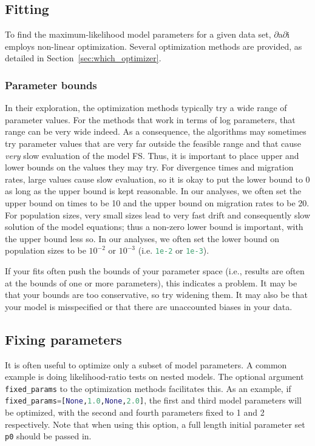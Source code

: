 \documentclass[12pt]{article}
\makeatletter
\newcommand{\dadi}{$\partial$a$\partial$i\xspace}
\newcommand{\py}[1]{\lstinline[language=Python, showstringspaces=False]@#1@}
\makeatother
\begin{document}
\subsection{Fitting}

To find the maximum-likelihood model parameters for a given data set, \dadi employs non-linear optimization.
Several optimization methods are provided, as detailed in Section~\ref{sec:which_optimizer}.

\subsubsection{Parameter bounds}

In their exploration, the optimization methods typically try a wide range of parameter values.
For the methods that work in terms of log parameters, that range can be very wide indeed.
As a consequence, the algorithms may sometimes try parameter values that are very far outside the feasible range and that cause \emph{very} slow evaluation of the model FS.
Thus, it is important to place upper and lower bounds on the values they may try.
For divergence times and migration rates, large values cause slow evaluation, so it is okay to put the lower bound to 0 as long as the upper bound is kept reasonable.
In our analyses, we often set the upper bound on times to be 10 and the upper bound on migration rates to be 20.
For population sizes, very small sizes lead to very fast drift and consequently slow solution of the model equations; thus a non-zero lower bound is important, with the upper bound less so.
In our analyses, we often set the lower bound on population sizes to be $10^{-2}$ or $10^{-3}$ (i.e. \py{1e-2} or \py{1e-3}).

If your fits often push the bounds of your parameter space (i.e., results are often at the bounds of one or more parameters), this indicates a problem.
It may be that your bounds are too conservative, so try widening them.
It may also be that your model is misspecified or that there are unaccounted biases in your data.

\subsection{Fixing parameters}

It is often useful to optimize only a subset of model parameters.
A common example is doing likelihood-ratio tests on nested models.
The optional argument \py{fixed_params} to the optimization methods facilitates this.
As an example, if \py{fixed_params=[None,1.0,None,2.0]}, the first and third model parameters will be optimized, with the second and fourth parameters fixed to 1 and 2 respectively.
Note that when using this option, a full length initial parameter set \py{p0} should be passed in.
\end{document}
